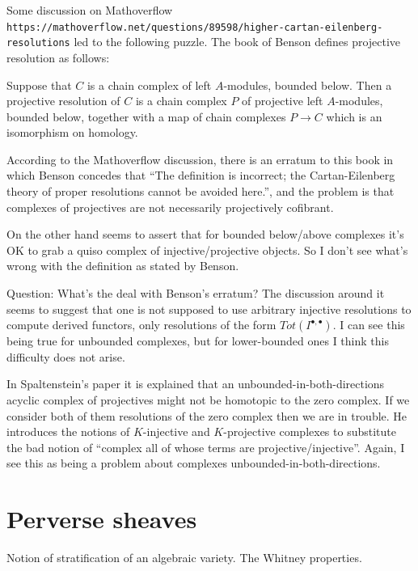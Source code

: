 \documentclass[12pt]{article}
\theoremstyle{plain}
\theoremstyle{definition}
\numberwithin{equation}{section}
\begin{document}
Some discussion on Mathoverflow \texttt{https://mathoverflow.net/questions/89598/higher-cartan-eilenberg-resolutions} led to the following puzzle. The book of Benson {\cite[Definition 2.7.4]{Benson}} defines projective resolution as follows:
\begin{displayquote}
Suppose that $C$ is a chain complex of left $A$-modules, bounded below. Then a projective resolution of $C$ is a chain complex $P$ of projective left $A$-modules, bounded below, together with a map of chain complexes $P \rightarrow C$ which is an isomorphism on homology.
\end{displayquote}
According to the Mathoverflow discussion, there is an erratum to this book in which Benson concedes that ``The definition is incorrect; the Cartan-Eilenberg theory of proper resolutions cannot be avoided here.'', and the problem is that complexes of projectives are not necessarily projectively cofibrant.

On the other hand {\cite[Theorem 10.5.6]{Weibel}} seems to assert that for bounded below/above complexes it's OK to grab a quiso complex of injective/projective objects. So I don't see what's wrong with the definition as stated by Benson.

{\color{red}Question: What's the deal with Benson's erratum? The discussion around it seems to suggest that one is not supposed to use arbitrary injective resolutions to compute derived functors, only resolutions of the form $Tot(I^{\bullet, \bullet})$. I can see this being true for unbounded complexes, but for lower-bounded ones I think this difficulty does not arise.}


In Spaltenstein's paper {\cite[p. 124]{Spaltenstein}} it is explained that an unbounded-in-both-directions acyclic complex of projectives might not be homotopic to the zero complex. If we consider both of them resolutions of the zero complex then we are in trouble. He introduces the notions of $K$-injective and $K$-projective complexes to substitute the bad notion of ``complex all of whose terms are projective/injective''. Again, I see this as being a problem about complexes unbounded-in-both-directions.






\section{Perverse sheaves}


Notion of stratification of an algebraic variety. The Whitney properties.
\end{document}
